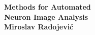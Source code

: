\setlength{\parindent}{0pt}
\thispagestyle{empty}
\begin{center}
  \vspace*{5mm}
  {\huge\bf Methods for Automated\\[0.3ex] Neuron Image Analysis\\}
  \vspace{12.85cm}
  {\large\bf Miroslav Radojevi\'{c}}
\end{center}
\setlength{\parindent}{\myindent}


